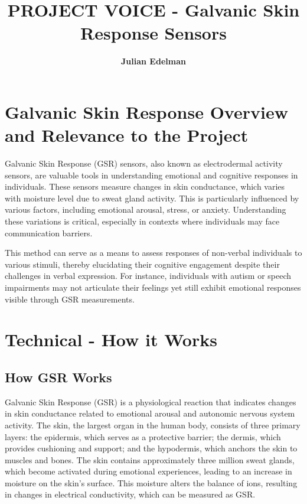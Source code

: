 \documentclass[twocolumn]{article}
\title{\textbf{PROJECT VOICE - Galvanic Skin Response Sensors}}
\author{\textbf{Julian Edelman}}
\begin{document}
\maketitle

\section{Galvanic Skin Response Overview and Relevance to the Project}

Galvanic Skin Response (GSR) sensors, also known as electrodermal activity sensors, are valuable tools in understanding emotional and cognitive responses in individuals. These sensors measure changes in skin conductance, which varies with moisture level due to sweat gland activity. This is particularly influenced by various factors, including emotional arousal, stress, or anxiety. Understanding these variations is critical, especially in contexts where individuals may face communication barriers.

This method can serve as a means to assess responses of non-verbal individuals to various stimuli, thereby elucidating their cognitive engagement despite their challenges in verbal expression. For instance, individuals with autism or speech impairments may not articulate their feelings yet still exhibit emotional responses visible through GSR measurements.

\section{Technical - How it Works}

\subsection{How GSR Works}
Galvanic Skin Response (GSR) is a physiological reaction that indicates changes in skin conductance related to emotional arousal and autonomic nervous system activity. The skin, the largest organ in the human body, consists of three primary layers: the epidermis, which serves as a protective barrier; the dermis, which provides cushioning and support; and the hypodermis, which anchors the skin to muscles and bones. The skin contains approximately three million sweat glands, which become activated during emotional experiences, leading to an increase in moisture on the skin's surface. This moisture alters the balance of ions, resulting in changes in electrical conductivity, which can be measured as GSR.\cite{imotionsGalvanicSkin}
\end{document}
